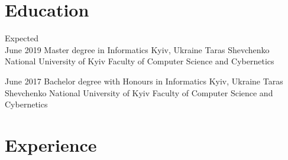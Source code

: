 \documentclass[letterpaper]{twentysecondcv} %
\begin{document}
\makeprofile %

\section{Education}

\begin{twenty} %
	\twentyitem
    	{Expected \\ June 2019}
        {Master degree in Informatics}
        {Kyiv, Ukraine}
        {Taras Shevchenko National University of Kyiv}
        {Faculty of Computer Science and Cybernetics}
        
	\twentyitem
    	{June 2017}
        {Bachelor degree with Honours in Informatics}
        {Kyiv, Ukraine}
        {Taras Shevchenko National University of Kyiv}
        {Faculty of Computer Science and Cybernetics}
        
\end{twenty}



\section{Experience}
\end{document}
